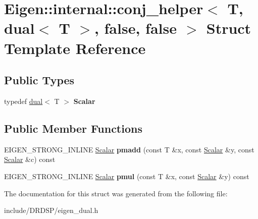 \hypertarget{struct_eigen_1_1internal_1_1conj__helper_3_01_t_00_01dual_3_01_t_01_4_00_01false_00_01false_01_4}{\section{Eigen\-:\-:internal\-:\-:conj\-\_\-helper$<$ T, dual$<$ T $>$, false, false $>$ Struct Template Reference}
\label{struct_eigen_1_1internal_1_1conj__helper_3_01_t_00_01dual_3_01_t_01_4_00_01false_00_01false_01_4}
}
\subsection*{Public Types}
\begin{DoxyCompactItemize}
\item 
\hypertarget{struct_eigen_1_1internal_1_1conj__helper_3_01_t_00_01dual_3_01_t_01_4_00_01false_00_01false_01_4_a617b60ca727ebd5582c76e0535f74294}{typedef \hyperlink{struct_d_r_d_s_p_1_1dual}{dual}$<$ T $>$ {\bfseries Scalar}}\label{struct_eigen_1_1internal_1_1conj__helper_3_01_t_00_01dual_3_01_t_01_4_00_01false_00_01false_01_4_a617b60ca727ebd5582c76e0535f74294}

\end{DoxyCompactItemize}
\subsection*{Public Member Functions}
\begin{DoxyCompactItemize}
\item 
\hypertarget{struct_eigen_1_1internal_1_1conj__helper_3_01_t_00_01dual_3_01_t_01_4_00_01false_00_01false_01_4_ae96160e41d96b460137eb9b509016215}{E\-I\-G\-E\-N\-\_\-\-S\-T\-R\-O\-N\-G\-\_\-\-I\-N\-L\-I\-N\-E \hyperlink{struct_d_r_d_s_p_1_1dual}{Scalar} {\bfseries pmadd} (const T \&x, const \hyperlink{struct_d_r_d_s_p_1_1dual}{Scalar} \&y, const \hyperlink{struct_d_r_d_s_p_1_1dual}{Scalar} \&c) const }\label{struct_eigen_1_1internal_1_1conj__helper_3_01_t_00_01dual_3_01_t_01_4_00_01false_00_01false_01_4_ae96160e41d96b460137eb9b509016215}

\item 
\hypertarget{struct_eigen_1_1internal_1_1conj__helper_3_01_t_00_01dual_3_01_t_01_4_00_01false_00_01false_01_4_a0f69a7f623ff7e8b7f003826de20575b}{E\-I\-G\-E\-N\-\_\-\-S\-T\-R\-O\-N\-G\-\_\-\-I\-N\-L\-I\-N\-E \hyperlink{struct_d_r_d_s_p_1_1dual}{Scalar} {\bfseries pmul} (const T \&x, const \hyperlink{struct_d_r_d_s_p_1_1dual}{Scalar} \&y) const }\label{struct_eigen_1_1internal_1_1conj__helper_3_01_t_00_01dual_3_01_t_01_4_00_01false_00_01false_01_4_a0f69a7f623ff7e8b7f003826de20575b}

\end{DoxyCompactItemize}


The documentation for this struct was generated from the following file\-:\begin{DoxyCompactItemize}
\item 
include/\-D\-R\-D\-S\-P/eigen\-\_\-dual.\-h\end{DoxyCompactItemize}
